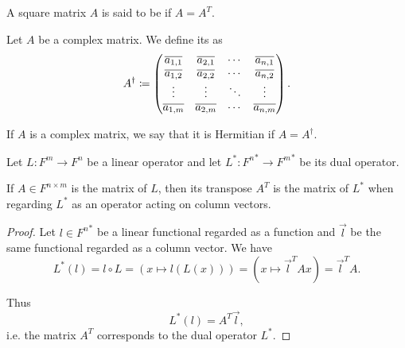 \begin{definition}\label{def:symmetric_matrix}
  A square matrix \( A \) is said to be  if \( A = A^T \).
\end{definition}

\begin{definition}\label{def:matrix_conjugate_transpose}
  Let \( A \) be a complex matrix. We define its  as
  \begin{equation*}
    A^\dagger \coloneqq \begin{pmatrix}
      \overline{a_{1,1}} & \overline{a_{2,1}} & \cdots & \overline{a_{n,1}} \\
      \overline{a_{1,2}} & \overline{a_{2,2}} & \cdots & \overline{a_{n,2}} \\
      \vdots  & \vdots  & \ddots & \vdots \\
      \overline{a_{1,m}} & \overline{a_{2,m}} & \cdots & \overline{a_{n,m}}
    \end{pmatrix}.
  \end{equation*}
\end{definition}

\begin{definition}\label{def:hermitian_matrix}
  If \( A \) is a complex matrix, we say that it is Hermitian if \( A = A^\dagger \).
\end{definition}

\begin{proposition}\label{thm:dual_linear_operator_matrix_transpose}
  Let \( L: F^m \to F^n \) be a linear operator and let \( L^*: {F^n}^* \to {F^m}^* \) be its dual operator.

  If \( A \in F^{n \times m} \) is the matrix of \( L \), then its transpose \( A^T \) is the matrix of \( L^* \) when regarding \( L^* \) as an operator acting on column vectors.
\end{proposition}
\begin{proof}
  Let \( l \in {F^n}^* \) be a linear functional regarded as a function and \( \vec l \) be the same functional regarded as a column vector. We have
  \begin{equation*}
    L^*(l)
    =
    l \circ L
    =
    (x \mapsto l(L(x)))
    =
    (x \mapsto \vec l^T Ax)
    =
    \vec l^T A.
  \end{equation*}

  Thus
  \begin{equation*}
    L^*(l) = A^T \vec l,
  \end{equation*}
  i.e. the matrix \( A^T \) corresponds to the dual operator \( L^* \).
\end{proof}

